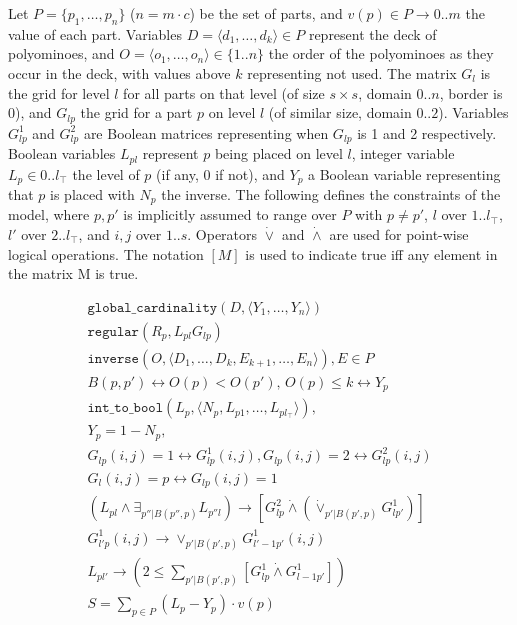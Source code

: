 \documentclass[letterpaper]{article} %
\newcommand{\cons}[1]{\texttt{#1}}
\begin{document}
Let $P=\{p_1,\ldots,p_n\}$ ($n=m\cdot c$) be the set of parts, and
$v(p)\in P\to {0..m}$ the value of each part. Variables
$D=\langle d_1,\ldots,d_k\rangle\in P$ represent the deck of
polyominoes, and $O=\langle o_1,\ldots,o_n\rangle\in\{1..n\}$ the
order of the polyominoes as they occur in the deck, with values above
$k$ representing not used. The matrix $G_l$ is the grid for level $l$
for all parts on that level (of size $s\times s$, domain $0..n$,
border is 0), and $G_{lp}$ the grid for a part $p$ on level $l$ (of
similar size, domain $0..2$). Variables $G_{lp}^1$ and $G_{lp}^2$ are
Boolean matrices representing when $G_{lp}$ is 1 and 2
respectively. Boolean variables $L_{pl}$ represent $p$ being placed on
level $l$, integer variable $L_p\in {0..l_ \top}$ the level of $p$ (if
any, 0 if not), and $Y_p$ a Boolean variable representing that $p$ is
placed with $N_p$ the inverse. The following defines the constraints
of the model, where $p, p'$ is implicitly assumed to range over $P$
with $p\neq p'$, $l$ over $1..l_\top$, $l'$ over $2..l_\top$, and
$i,j$ over $1..s$. Operators $\dot{\lor}$ and $\dot{\land}$ are used
for point-wise logical operations. The notation $[M]$ is used to
indicate true iff any element in the matrix M is true.

\begin{gather}
  \cons{global\_cardinality}(D, \langle
  Y_1,\ldots,Y_n\rangle) \label{cons:gcc}\\
  \cons{regular}(R_p, L_{pl}G_{lp})\label{cons:placement}\\
  \cons{inverse}(O, \langle D_1,\ldots,D_k,E_{k+1},\ldots,E_n\rangle),
  E\in P\label{cons:orderchannel}\\
  B(p,p') \leftrightarrow O(p) < O(p'),\, O(p)\leq k\leftrightarrow Y_p \label{cons:orderchannel2}\\
  \cons{int\_to\_bool}(L_p, \langle N_p, L_{p1},\ldots,L_{pl_\top}\rangle), \label{cons:levelchannel}\\
  Y_p = 1 - N_p,%
  \label{cons:minorchannel}\\
  G_{lp}(i,j)=1\leftrightarrow G_{lp}^1(i,j), G_{lp}(i,j)=2\leftrightarrow G_{lp}^2(i,j)  \label{cons:aspectchannel}\\
  G_l(i,j) = p \leftrightarrow G_{lp}(i,j) = 1 \label{cons:gridchannel}\\
  \left(L_{pl}\land\exists_{p''|B(p'', p)}L_{p''l}\right)\rightarrow \left[G_{lp}^2 \dot{\land} \left(\dot{\lor}_{p'|B(p',p)}
      G_{lp'}^1\right)\right]
  \label{cons:connected}\\
  G_{l'p}^1(i,j) \rightarrow \lor_{p'|B(p',p)} G_{l'-1p'}^1(i,j)
  \label{cons:ontop}\\
  L_{pl'}\rightarrow\left(2\leq\textstyle \sum_{p'|B(p',p)} [G_{lp}^1 \dot{\land} G_{l-1p'}^1]\right)
  \label{cons:atleasttwo}\\
  S = \textstyle \sum_{p\in P} (L_p-Y_p)\cdot v(p)\label{cons:score}
\end{gather}
\end{document}
